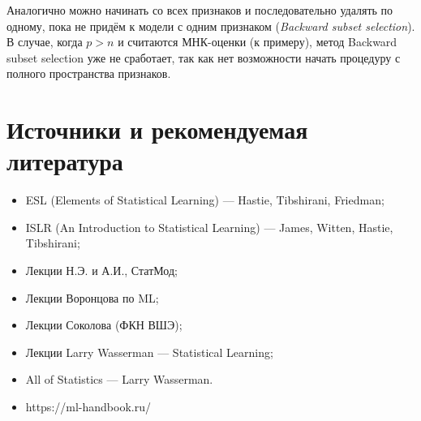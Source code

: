 \documentclass[12pt,a4paper,final]{article}
\newcommand{\1}{\mathds{1}}
\begin{document}
Аналогично можно начинать со всех признаков и последовательно удалять по одному, пока не придём к модели с одним признаком (\textit{Backward subset selection}). В случае, когда $p>n$ и считаются МНК-оценки (к примеру), метод Backward subset selection уже не сработает, так как нет возможности начать процедуру с полного пространства признаков.

\section{Источники и рекомендуемая литература}

\begin{itemize}
	\item ESL (Elements of Statistical Learning) --- Hastie, Tibshirani, Friedman;
	\item ISLR (An Introduction to Statistical Learning) --- James, Witten, Hastie, Tibshirani;
	\item Лекции Н.Э. и А.И., СтатМод;
	\item Лекции Воронцова по ML;
	\item Лекции Соколова (ФКН ВШЭ);	
	\item Лекции Larry Wasserman --- Statistical Learning;
	\item All of Statistics --- Larry Wasserman.
	
	\item https://ml-handbook.ru/

	\end{itemize}
\end{document}

